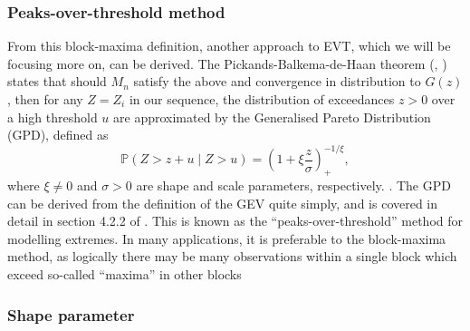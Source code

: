 \documentclass{article}
\numberwithin{equation}{section}
\begin{document}
\subsubsection{Peaks-over-threshold method}

From this block-maxima definition, another approach to EVT, which we will be focusing more on, can be derived. 
The Pickands-Balkema-de-Haan theorem (\cite{Pickands1975}, \cite{Balkema1974}) states that should $M_n$ satisfy the above  and convergence in distribution to $G(z)$, then for any $Z = Z_i$ in our sequence, the distribution of exceedances $z > 0$ over a high threshold $u$ are approximated by the Generalised Pareto Distribution (GPD), defined as
\begin{equation} \label{eq:gpd}
  \mathbb{P}(Z > z + u \mid Z > u) = \left(1 + \xi \frac{z}{\sigma} \right)_{+}^{-1/\xi},
\end{equation}
where $\xi \ne 0$ and $\sigma > 0$ are shape and scale parameters, respectively. .
The GPD can be derived from the definition of the GEV quite simply, and is covered in detail in section 4.2.2 of \cite{Coles2001}. 
This is known as the ``peaks-over-threshold'' method for modelling extremes. 
In many applications, it is preferable to the block-maxima method, as logically there may be many observations within a single block which exceed so-called ``maxima'' in other blocks 

\subsubsection{Shape parameter}
\end{document}
